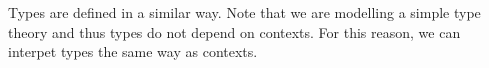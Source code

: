 
Types are defined in a similar way.
Note that we are modelling a simple type theory and thus types do not depend on contexts.
For this reason, we can interpet types the same way as contexts.

\begin{code}%
\>[0]\AgdaSpace{}%
\AgdaSymbol{:}\AgdaSpace{}%
\AgdaSpace{}%
\AgdaSpace{}%
\<%
\\
\>[0]\AgdaSpace{}%
\AgdaSpace{}%
\AgdaSymbol{=}\AgdaSpace{}%
\<%
\\
\>[0]\AgdaSpace{}%
\AgdaSpace{}%
\AgdaSymbol{=}\AgdaSpace{}%
\<%
\end{code}


